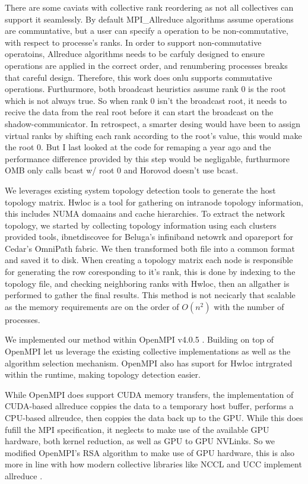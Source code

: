 There are some caviats with collective rank reordering as not all collectives can support it seamlessly.
By default MPI\_Allreduce algorithms assume operations are communtative, but a user can specify a operation to be non-commutative, with respect to processe's ranks. 
In order to support non-commutative operatoins, Allreduce algorithms needs to be carfuly designed to ensure operations are applied in the correct order, and renumbering processes breaks that careful design.
Therefore, this work does onlu supports commutative operations.
Furthurmore, both broadcast heuristics assume rank 0 is the root which is not always true. 
So when rank 0 isn't the broadcast root, it needs to recive the data from the real root before it can start the broadcast on the shadow-communicator.
In retrospect, a smarter desing would have been to assign virtual ranks by shifting each rank according to the root's value, this would make the root 0.
But I last looked at the code for remaping a year ago and the performance difference provided by this step would be negligable, furthurmore OMB only calls bcast w/ root 0 and Horovod doesn't use bcast.

We leverages existing system topology detection tools to generate the host topology matrix.
Hwloc \cite{Broquedis2010hwloc} is a tool for gathering on intranode topology information, this includes NUMA domaains and cache hierarchies.
To extract the network topology, we started by collecting topology information using each clusters provided tools, ibnetdiscovee for Beluga's infiniband netowrk and opareport for Cedar's OmniPath fabric.
We then transformed both file into a common format and saved it to disk.
When creating a topology matrix each node is responsible for generating the row coresponding to it's rank, this is done by indexing to the topology file, and checking neighboring ranks with Hwloc, then an allgather is performed to gather the final results.
This method is not necicarly that scalable as the memory requirements are on the order of $O(n^2)$ with the number of processes.

We implemented our method within OpenMPI v4.0.5 \cite{gabriel2004OpenMPI}.
Building on top of OpenMPI let us leverage the existing collective implementations as well as the algorithm selection mechanism.
OpenMPI also has suport for Hwloc intrgrated within the runtime, making topology detection easier.

While OpenMPI does support CUDA memory transfers, the implementation of CUDA-based allreduce coppies the data to a temporary host buffer, performs a CPU-based allreudce, then coppies the data back up to the GPU.
While this does fufill the MPI specification, it neglects to make use of the available GPU hardware, both kernel reduction, as well as GPU to GPU NVLinks.
So we modified OpenMPI's RSA algorithm to make use of GPU hardware, this is also more in line with how modern collective libraries like NCCL and UCC implement allreduce \cite{UCC, NCCL}.


